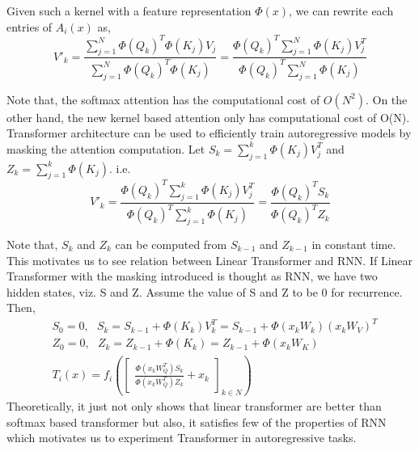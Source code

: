 \documentclass{article}
\begin{document}
Given such a kernel with a feature representation $\Phi(x)$, we can rewrite 
each entries of $A_i(x)$ as,
\begin{equation}
    V'_k=\frac{\sum_{j=1}^{N}\Phi(Q_k)^T\Phi(K_j)V_j}{\sum_{j=1}^{N}\Phi(Q_k)^T\Phi(K_j)}=\frac{\Phi(Q_k)^T\sum_{j=1}^{N}\Phi(K_j)V_j^T}{\Phi(Q_k)^T\sum_{j=1}^{N}\Phi(K_j)}  
\end{equation}

Note that, the softmax attention has the computational cost of $O(N^2)$. On the other hand, the new kernel based attention only has computational cost of O(N).
Transformer architecture can be used to efficiently train autoregressive models by masking the attention computation. Let $S_k=\sum_{j=1}^{k}\Phi(K_j)V_j^T$ and $Z_k=\sum_{j=1}^{k}\Phi(K_j)$. i.e. 
\begin{equation}
    V'_k=\frac{\Phi(Q_k)^T\sum_{j=1}^{k}\Phi(K_j)V_j^T}{\Phi(Q_k)^T\sum_{j=1}^{k}\Phi(K_j)}=\frac{\Phi(Q_k)^TS_k}{\Phi(Q_k)^TZ_k}
\end{equation}

Note that, $S_k$ and $Z_k$ can be computed from $S_{k-1}$ and $Z_{k-1}$ in constant time. This motivates us to see relation between Linear Transformer and RNN. If Linear Transformer with the masking introduced is thought as RNN, we have two hidden states, viz. S and Z. Assume the value of S and Z to be 0 for recurrence. Then,
\begin{align*}
    &S_0=0,\text{ } S_k=S_{k-1}+\Phi(K_k)V_k^T=S_{k-1}+\Phi(x_kW_k)(x_kW_V)^T\\
    &Z_0=0,\text{ } Z_k=Z_{k-1}+\Phi(K_k)=Z_{k-1}+\Phi(x_kW_K)\\
    &T_i(x)=f_i(\begin{bmatrix}
        \frac{\Phi(x_kW_Q^T)S_k}{\Phi(x_kW_Q^T)Z_k}+x_k
    \end{bmatrix}_{k \in N})
\end{align*}
Theoretically, it just not only shows that linear transformer are better than softmax based transformer but also, it satisfies few of the properties of RNN which motivates us to experiment Transformer in autoregressive tasks.
\end{document}
